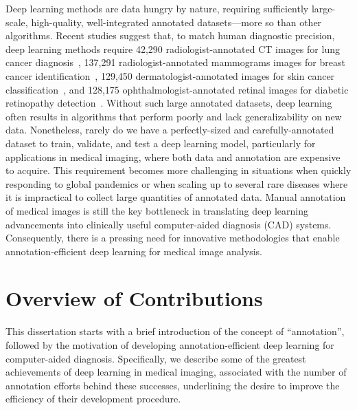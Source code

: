 Deep learning methods are data hungry by nature, requiring sufficiently large-scale, high-quality, well-integrated annotated datasets---more so than other algorithms. Recent studies suggest that, to match human diagnostic precision, deep learning methods require 42,290 radiologist-annotated CT images for lung cancer diagnosis~\citep{ardila2019end}, 137,291 radiologist-annotated mammograms images for breast cancer identification~\citep{mckinney2020international}, 129,450 dermatologist-annotated images for skin cancer classification~\citep{esteva2017dermatologist}, and 128,175 ophthalmologist-annotated retinal images for diabetic retinopathy detection~\citep{gulshan2016development}. Without such large annotated datasets, deep learning often results in algorithms that perform poorly and lack generalizability on new data. Nonetheless, rarely do we have a perfectly-sized and carefully-annotated dataset to train, validate, and test a deep learning model, particularly for applications in medical imaging, where both data and annotation are expensive to acquire. This requirement becomes more challenging in situations when quickly responding to global pandemics or when scaling up to several rare diseases where it is impractical to collect large quantities of annotated data. Manual annotation of medical images is still the key bottleneck in translating deep learning advancements into clinically useful computer-aided diagnosis (CAD) systems. Consequently, there is a pressing need for innovative methodologies that enable annotation-efficient deep learning for medical image analysis.








\section{Overview of Contributions}
\label{ch1:thesis_outline}

This dissertation starts with a brief introduction of the concept of ``annotation'', followed by the motivation of developing annotation-efficient deep learning for computer-aided diagnosis. Specifically, we describe some of the greatest achievements of deep learning in medical imaging, associated with the number of annotation efforts behind these successes, underlining the desire to improve the efficiency of their development procedure. 


